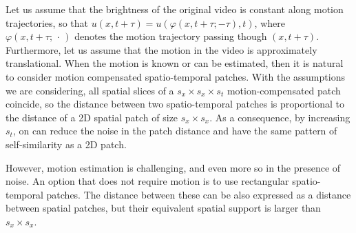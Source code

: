 \documentclass[10pt, journal, twocolumn, final, a4paper]{IEEEtran}
\begin{document}
Let us assume that 
the brightness of the original video is constant along motion trajectories, so
that $u(x,t + \tau) = u(\varphi(x,t + \tau; -\tau),t)$, where
$\varphi(x,t+\tau;\, \cdot\, )$ denotes the motion trajectory passing though
$(x,t + \tau)$.
Furthermore, let us assume that the motion in the video is approximately
translational.
When the motion is known or can be estimated, then it is natural to consider
motion compensated spatio-temporal patches. 
With the assumptions we are considering, all spatial slices of a $s_x\times s_x\times s_t$ motion-compensated patch
coincide, so the distance between two spatio-temporal patches is proportional to
the distance of a 2D spatial patch of size $s_x\times s_x$.
%
As a consequence, by increasing $s_t$, on can reduce the 
noise in the patch distance and have the same pattern of self-similarity as a 
2D patch.

However, motion estimation is challenging, and even more so in the presence of noise.
An option that does not require motion is to use rectangular spatio-temporal patches.
The distance between these can be also expressed as a distance between spatial patches,
but their equivalent spatial support is larger than $s_x\times s_x$.
\end{document}
